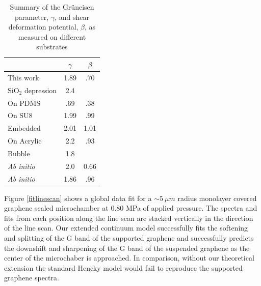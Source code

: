 \begin{table}
\begin{center}
\begin{tabular}{l c  c }
\hline
\hline
 & $\gamma$ & $\beta$ \\
 \hline
 This work & 1.89 & .70 \\
 $\mathrm{SiO_2}$ depression\cite{Metzger2010} & 2.4 & \\
 On PDMS\cite{Huang2009} & .69 & .38 \\
 On SU8\cite{Mohiuddin2009} & 1.99 & .99\\
 Embedded\cite{Frank2010} & 2.01 & 1.01 \\
 On Acrylic\cite{Yoon2011} & 2.2 & .93\\
 Bubble\cite{Zabel2012} & 1.8 \\
\textit{Ab initio} \cite{Thomsen2002} & 2.0 & 0.66 \\
\textit{Ab initio} \cite{Cheng2011} & 1.86 & .96\\
 \hline
 \hline
\end{tabular}
\end{center}
\caption{\label{gb} Summary of the Gr\"{u}neisen parameter, $\gamma$, and shear deformation potential, $\beta$, as measured on different substrates}
\end{table}

Figure \ref{fitlinescan} shows a global data fit for a $\sim 5 \ \mu m$ radius monolayer covered graphene sealed microchamber at 0.80 MPa of applied pressure.  The spectra and fits from each position along the line scan are stacked vertically in the direction of the line scan.  Our extended continuum model successfully fits the softening and splitting of the G band of the supported graphene and successfully predicts the downshift and sharpening of the G band of the suspended graphene as the center of the microchaber is approached. In comparison, without our theoretical extension the standard Hencky model would fail to reproduce the supported graphene spectra.

